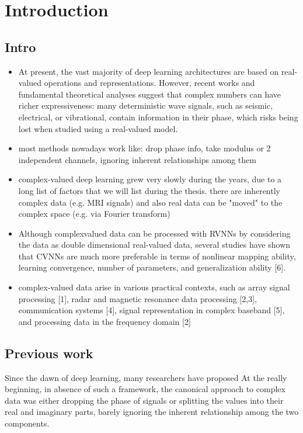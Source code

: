 \documentclass[../main.tex]{subfiles}
\begin{document}
\chapter{Introduction}

\section{Intro}
\begin{itemize}
	\item At present, the vast majority of deep learning architectures are based on real-valued operations and representations. However, recent works and fundamental theoretical analyses suggest that complex numbers can have richer expressiveness: many deterministic wave signals, such as seismic, electrical, or vibrational, contain information in their phase, which risks being lost when studied using a real-valued model.
	\item most methods nowadays work like: drop phase info, take modulus or 2 independent channels, ignoring inherent relationships among them
	\item complex-valued deep learning grew very slowly during the years, due to a long list of factors that we will list during the thesis. there are inherently complex data (e.g. MRI signals) and also real data can be "moved" to the complex space (e.g. via Fourier transform)
	\item Although complexvalued data can be processed with RVNNs by considering the data as double
dimensional real-valued data, several studies have shown that CVNNs are much
	more preferable in terms of nonlinear mapping ability, learning convergence,
	number of parameters, and generalization ability [6].
	\item complex-valued data arise in	various practical contexts, such as array signal processing [1], radar and magnetic
resonance data processing [2,3], communication systems [4], signal representation in complex baseband [5], and processing data in the frequency domain [2]
\end{itemize}

\section{Previous work}

Since the dawn of deep learning, many researchers have proposed 
At the really beginning, in absence of such a framework, the canonical approach to complex data was either dropping the phase of signals or splitting the values into their real and imaginary parts, barely ignoring the inherent relationship among the two components. 
\end{document}
